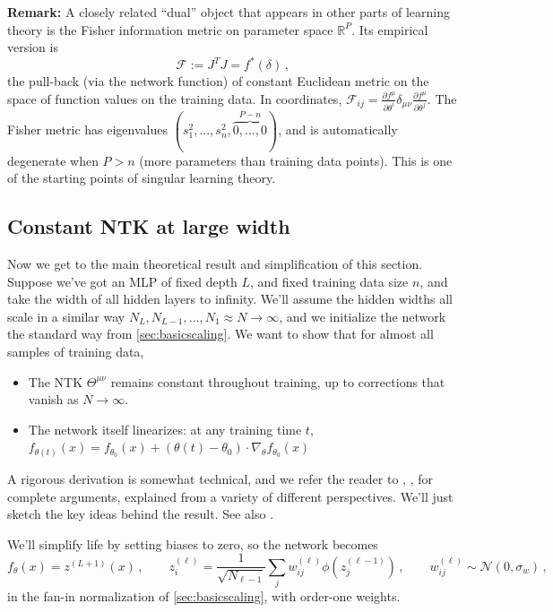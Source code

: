 \documentclass[11pt]{article}
\newcommand{\R}{\mathbb{R}}
\newcommand{\CN}{{\mathcal N}}
\newcommand{\pd}{\partial}
\begin{document}
\smallskip
\noindent\textbf{Remark:} A closely related ``dual'' object that appears in other parts of learning theory is the Fisher information metric on parameter space $\R^P$. Its empirical version is
%
\begin{equation} \mathcal F := J^TJ = f^*(\delta)\,, \end{equation}
%
the pull-back (via the network function) of constant Euclidean metric on the space of function values on the training data.
In coordinates, $\mathcal F_{ij} =\frac{\pd f^\mu}{\pd \theta^i}\delta_{\mu\nu} \frac{\pd f^\mu}{\pd \theta^j}$.
%
The Fisher metric has eigenvalues $(s_1^2,...,s_n^2,\overbrace{0,...,0}^{P-n})$, and is automatically degenerate when $P>n$ (more parameters than training data points). This is one of the starting points of singular learning theory.


\subsection{Constant NTK at large width}
\label{sec:NTK-const}

Now we get to the main theoretical result and simplification of this section. Suppose we've got an MLP of fixed depth $L$, and fixed training data size $n$, and take the width of all hidden layers to infinity. We'll assume the hidden widths all scale in a similar way $N_L,N_{L-1},...,N_1\approx N\to \infty$, and we initialize the network the standard way from \cref{sec:basicscaling}. We want to show that for almost all samples of training data,
\begin{itemize}
    \item The NTK $\Theta^{\mu\nu}$ remains constant throughout training, up to corrections that vanish as $N\to\infty$.
    \item The network itself linearizes: at any training time $t$, $f_{\theta(t)}(x) =f_{\theta_0}(x) + (\theta(t)-\theta_0)\cdot\nabla_\theta f_{\theta_0}(x)$
\end{itemize}

A rigorous derivation is somewhat technical, and we refer the reader to \cite{du2019gradient,jacot2018neural}, \cite[Ch. 11]{roberts2022principles}, \cite[Ch. 20]{spiliopoulos2025foundations} for complete arguments, explained from a variety of different perspectives. We'll just sketch the key ideas behind the result. See also \cite[Lecture 3]{hanin2026mdl}.

We'll simplify life by setting biases to zero, so the network becomes
%
\begin{equation}  f_\theta(x) = z^{(L+1)}(x)\,,\qquad z^{(\ell)}_i = \frac{1}{\sqrt{N_{\ell-1}}}\sum_j w_{ij}^{(\ell)} \phi(z_j^{(\ell-1)})\,,\qquad w^{(\ell)}_{ij}\sim\CN(0,\sigma_w)\,,
\end{equation}
%
in the fan-in normalization of \cref{sec:basicscaling}, with order-one weights.
\end{document}
